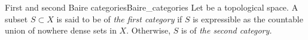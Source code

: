 \begin{definition}{First and second Baire categories}{Baire_categories}
    Let  be a topological space. A subset \(S \subset X\) is said to be of \emph{the first category} if \(S\) is expressible as the countable union of nowhere dense sets in \(X\). Otherwise, \(S\) is of \emph{the second category.}
\end{definition}
